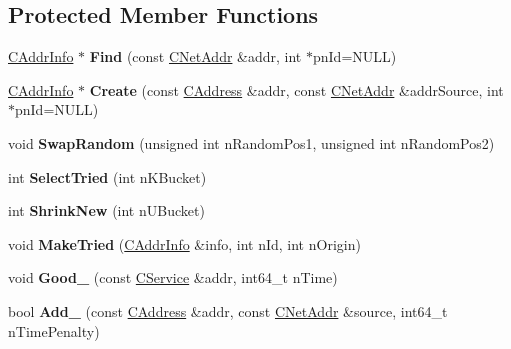 \subsection*{Protected Member Functions}
\begin{DoxyCompactItemize}
\item 
\mbox{\label{class_c_addr_man_ac961ead1a1afde144fc486b6d7c7369d}} 
\mbox{\hyperlink{class_c_addr_info}{C\+Addr\+Info}} $\ast$ {\bfseries Find} (const \mbox{\hyperlink{class_c_net_addr}{C\+Net\+Addr}} \&addr, int $\ast$pn\+Id=N\+U\+LL)
\item 
\mbox{\label{class_c_addr_man_aac93f51c0580e38a950a0f63b053bedb}} 
\mbox{\hyperlink{class_c_addr_info}{C\+Addr\+Info}} $\ast$ {\bfseries Create} (const \mbox{\hyperlink{class_c_address}{C\+Address}} \&addr, const \mbox{\hyperlink{class_c_net_addr}{C\+Net\+Addr}} \&addr\+Source, int $\ast$pn\+Id=N\+U\+LL)
\item 
\mbox{\label{class_c_addr_man_a3074bc8e3dcfb5348054613f575dc38e}} 
void {\bfseries Swap\+Random} (unsigned int n\+Random\+Pos1, unsigned int n\+Random\+Pos2)
\item 
\mbox{\label{class_c_addr_man_a9c466eca7afe5c12554da5734f89e656}} 
int {\bfseries Select\+Tried} (int n\+K\+Bucket)
\item 
\mbox{\label{class_c_addr_man_aebf83da3addc3bcee487a87ece3f9a2b}} 
int {\bfseries Shrink\+New} (int n\+U\+Bucket)
\item 
\mbox{\label{class_c_addr_man_a0fd16da2a89fb973e8e0e1bb6183264a}} 
void {\bfseries Make\+Tried} (\mbox{\hyperlink{class_c_addr_info}{C\+Addr\+Info}} \&info, int n\+Id, int n\+Origin)
\item 
\mbox{\label{class_c_addr_man_a33ec6a4584cf4b17af821e6e35216459}} 
void {\bfseries Good\+\_\+} (const \mbox{\hyperlink{class_c_service}{C\+Service}} \&addr, int64\+\_\+t n\+Time)
\item 
\mbox{\label{class_c_addr_man_a9dd6df8b1904548a86054d19d4a90724}} 
bool {\bfseries Add\+\_\+} (const \mbox{\hyperlink{class_c_address}{C\+Address}} \&addr, const \mbox{\hyperlink{class_c_net_addr}{C\+Net\+Addr}} \&source, int64\+\_\+t n\+Time\+Penalty)

\end{DoxyCompactItemize}
